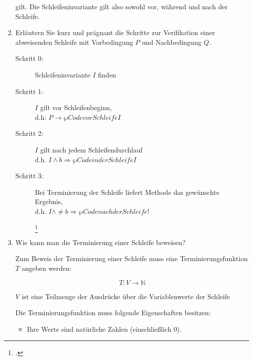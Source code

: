 \documentclass{lehramt-informatik-aufgabe}
\begin{document}
\begin{enumerate}
\begin{liAntwort}
\noindent
gilt. Die Schleifeninvariante gilt also sowohl vor, während und nach der
Schleife.
\end{liAntwort}


\item Erläutern Sie kurz und prägnant die Schritte zur Verifikation
einer abweisenden Schleife mit Vorbedingung $P$ und Nachbedingung $Q$.

\begin{liAntwort}
\begin{description}
\item[Schritt 0:] Schleifeninvariante $I$ finden

\item[Schritt 1:] $I$ gilt vor Schleifenbeginn,\\
d.h: $P \rightarrow \wp{Code vor Schleife}{I}$

\item[Schritt 2:] $I$ gilt nach jedem Schleifendurchlauf\\
d.h. $I \land b \Rightarrow \wp{Code in der Schleife}{I}$

\item[Schritt 3:]

Bei Terminierung der Schleife liefert Methode das gewünschte Ergebnis,\\
d.h. $I \land \neq b \Rightarrow \wp{Code nach der Schleife}{!}$

\footcite[Seite 31]{sosy:fs:5}
\end{description}
\end{liAntwort}


\item Wie kann man die Terminierung einer Schleife beweisen?

\begin{liAntwort}
Zum Beweis der Terminierung einer Schleife muss eine
Terminierungsfunktion $T$ angeben werden:

\begin{displaymath}
T \colon V \rightarrow \mathbb{N}
\end{displaymath}

\noindent
$V$ ist eine Teilmenge der Ausdrücke über die Variablenwerte der Schleife

Die Terminierungsfunktion muss folgende Eigenschaften besitzen:

\begin{itemize}
\item Ihre Werte sind natürliche Zahlen (einschließlich 0).


\end{itemize}
\end{liAntwort}
\end{enumerate}
\end{document}
